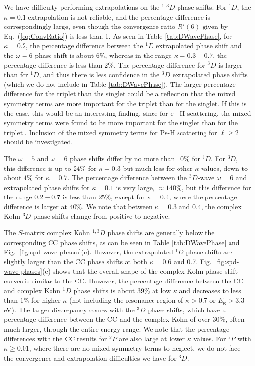 \documentclass[preprint,showpacs,showkeys,preprintnumbers,amsmath,amssymb,longbibliography,pra,aps]{revtex4-1}
\begin{document}
We have difficulty performing extrapolations on the $^{1,3}D$ phase shifts.
For $^1D$, the $\kappa = 0.1$ extrapolation is not reliable, and the
percentage difference is correspondingly large, even though the
convergence ratio $R'(6)$ given by Eq.~(\ref{eq:ConvRatio}) is less than 1. As seen in Table
\ref{tab:DWavePhase}, for $\kappa = 0.2$, the percentage difference
between the $^1D$ extrapolated phase shift and the $\omega = 6$ 
phase shift is about $6\%$,
whereas in the range $\kappa = 0.3 - 0.7$, the percentage difference is
less than $2\%$. The percentage difference for $^3D$ is larger than for $^1D$,
and thus there is less confidence in the $^3D$ extrapolated phase shifts (which we
do not include in Table \ref{tab:DWavePhase}). The larger percentage
difference for the triplet than the singlet could be a reflection that the
mixed symmetry terms are more important for the
triplet than for the singlet. If this is the case, this would be an interesting
finding, since for e$^-$-H scattering, the mixed symmetry terms were found to
be more important for the singlet than
for the triplet \cite{VanReeth2015}. Inclusion of the mixed symmetry terms for
Ps-H scattering for $\ell \geq 2$ should be investigated.

The $\omega = 5$ and $\omega = 6$ phase shifts differ by no more than
$10\%$ for $^1D$. For $^3D$, this difference is up to $24\%$ for
$\kappa=0.3$ but much less for other $\kappa$ values, down to
about $4\%$ for $\kappa = 0.7$.
The percentage difference between the $^3D$-wave $\omega = 6$ and extrapolated
phase shifts for $\kappa = 0.1$ is very large,
$\approx 140\%$, but this difference for the range $0.2 - 0.7$
is less than $25\%$, except for $\kappa = 0.4$, where the percentage
difference is larger at $40\%$. We note that between $\kappa = 0.3$
and $0.4$, the complex Kohn $^3D$ phase shifts change from positive 
to negative.

The $S$-matrix complex Kohn $^{1,3}D$ phase shifts are generally below the corresponding 
CC phase shifts, as can be seen in Table \ref{tab:DWavePhase} and
Fig.~\ref{fig:spd-wave-phases}(c). However, the extrapolated $^1D$ phase shifts
are slightly larger than the CC phase shifts at both $\kappa = 0.6$ and 0.7.
Fig.~\ref{fig:spd-wave-phases}(c) shows that the overall shape of the complex Kohn 
phase shift curves is similar to the CC. However, the percentage difference 
between the CC and complex Kohn $^1D$ phase shifts is about $39\%$ at low
$\kappa$ and decreases to less than $1\%$ for higher $\kappa$ (not including 
the resonance region of $\kappa > 0.7$ or $E_{ \bm \kappa} > 3.3$ eV). The 
larger discrepancy comes with the $^3D$ phase shifts, which have a percentage 
difference between the CC and the complex Kohn of over 30\%, often much 
larger, through the entire energy range. We note that the percentage 
differences with the CC results for $^3P$ are also large at lower $\kappa$ 
values. For $^3P$ with $\kappa \geq 0.01$, where there are no mixed symmetry
terms to neglect, we do not face the convergence and extrapolation 
difficulties we have for $^3D$.
\end{document}
